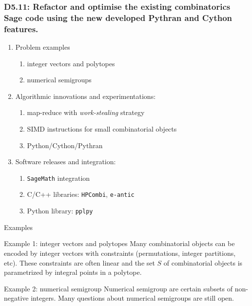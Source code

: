 \documentclass{beamer}
\begin{document}
\begin{frame}
  \frametitle{D5.11: Refactor and optimise the existing combinatorics Sage code using the new developed Pythran and Cython features.}

  \begin{enumerate}
  \item Problem examples
    \begin{enumerate}
    \item integer vectors and polytopes
    \item numerical semigroups
    \end{enumerate}
  \item Algorithmic innovations and experimentations:
    \begin{enumerate}
    
    \item map-reduce with \emph{work-stealing} strategy
    \item SIMD instructions for small combinatorial objects
    \item Python/Cython/Pythran
    \end{enumerate}
  \item Software releases and integration:
    \begin{enumerate}
    \item \texttt{SageMath} integration
    \item C/C++ libraries: \texttt{HPCombi}, \texttt{e-antic}
    \item Python library: \texttt{pplpy}
    \end{enumerate}
  \end{enumerate}

\end{frame}


\begin{frame}{Examples}
  \begin{block}{Example 1: integer vectors and polytopes}
  Many combinatorial objects can be encoded by integer vectors
  with constraints (permutations, integer partitions, etc).
  These constraints are often linear and the set $S$ of combinatorial
  objects is parametrized by integral points in a polytope.
  \end{block}

  \begin{block}{Example 2: numerical semigroup}
  Numerical semigroup are certain subsets of non-negative integers.
  Many questions about numerical semigroups are still open.
  \end{block}
\end{frame}
\end{document}

